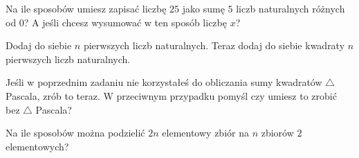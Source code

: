 \documentclass{article}
\begin{document}
\begin{zadanie}
  Na ile sposobów umiesz zapisać liczbę $25$ jako sumę $5$ liczb naturalnych różnych od $0$? A jeśli chcesz wysumować w ten sposób liczbę $x$? 
\end{zadanie}
  
\begin{zadanie}
  Dodaj do siebie $n$ pierwszych liczb naturalnych. Teraz dodaj do siebie kwadraty $n$ pierwszych liczb naturalnych. 
\end{zadanie}


\begin{zadanie}
  Jeśli w poprzednim zadaniu nie korzystałeś do obliczania sumy kwadratów $\triangle$ Pascala, zrób to teraz. W przeciwnym przypadku pomyśl czy umiesz to zrobić bez $\triangle$ Pascala?
\end{zadanie}

\begin{zadanie}
  Na ile sposobów można podzielić $2n$ elementowy zbiór na $n$ zbiorów $2$ elementowych? %
\end{zadanie}
\end{document}
